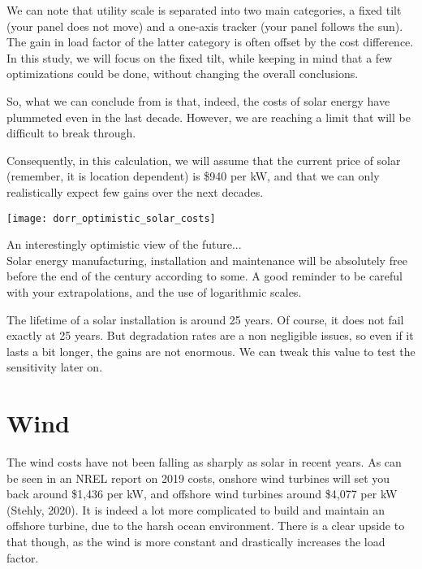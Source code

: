 We can note that utility scale is separated into two main categories, a fixed tilt (your panel does not move) and a one-axis tracker (your panel follows the sun). The gain in load factor of the latter category is often offset by the cost difference. In this study, we will focus on the fixed tilt, while keeping in mind that a few optimizations could be done, without changing the overall conclusions.

So, what we can conclude from  is that, indeed, the costs of solar energy have plummeted even in the last decade. However, we are reaching a limit that will be difficult to break through.

Consequently, in this calculation, we will assume that the current price of solar (remember, it is location dependent) is \$940 per kW, and that we can only realistically expect few gains over the next decades.


\begin{marginfigure}[-2mm]
	\texttt{[image: dorr\_optimistic\_solar\_costs]}
	\caption[An interestingly optimistic view of the future... Solar energy manufacturing, installation and maintenance will be absolutely free before the end of the century according to some. A good reminder to be careful with your extrapolations, and the use of logarithmic scales]{An interestingly optimistic view of the future...\\ Solar energy manufacturing, installation and maintenance will be absolutely free before the end of the century according to some. A good reminder to be careful with your extrapolations, and the use of logarithmic scales.}
\end{marginfigure}

The lifetime of a solar installation is around 25 years. Of course, it does not fail exactly at 25 years. But degradation rates are a non negligible issues, so even if it lasts a bit longer, the gains are not enormous. We can tweak this value to test the sensitivity later on.


\section{Wind}

The wind costs have not been falling as sharply as solar in recent years. As can be seen in an NREL report on 2019 costs, onshore wind turbines will set you back around \$1,436 per kW, and offshore wind turbines around \$4,077 per kW (Stehly, 2020). It is indeed a lot more complicated to build and maintain an offshore turbine, due to the harsh ocean environment. There is a clear upside to that though, as the wind is more constant and drastically increases the load factor.

